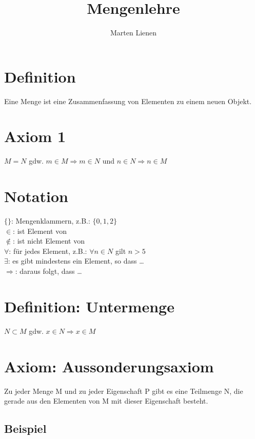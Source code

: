 \documentclass{article}
\title{Mengenlehre}
\author{Marten Lienen}
\begin{document}
\maketitle

\section{Definition}

Eine Menge ist eine Zusammenfassung von Elementen zu einem neuen Objekt.

\section{Axiom 1}

$M = N$ gdw. $m \in M \Longrightarrow m \in N$ und $n \in N \Longrightarrow n \in M$

\section{Notation}
$\{\}$: Mengenklammern, z.B.: $\{0, 1, 2\}$\\
$\in$: ist Element von\\
$\notin$: ist nicht Element von\\
$\forall$: für jedes Element, z.B.: $\forall n \in N$ gilt $n > 5$\\
$\exists$: es gibt mindestens ein Element, so dass \dots \\
$\Longrightarrow$: daraus folgt, dass \dots \\

\section{Definition: Untermenge}

$N \subset M$ gdw. $x \in N \Longrightarrow x \in M$

\section{Axiom: Aussonderungsaxiom}

Zu jeder Menge M und zu jeder Eigenschaft P gibt es eine Teilmenge N, die gerade aus den Elementen von M
mit dieser Eigenschaft besteht.

\subsection{Beispiel}
\end{document}
